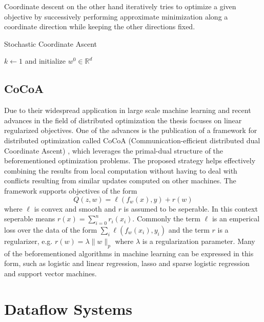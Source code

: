 Coordinate descent on the other hand iteratively tries to optimize a given objective by successively performing approximate minimization along a coordinate direction while keeping the other directions fixed.


\begin{algorithm}
\caption{Stochastic Coordinate Ascent}\label{alg:sca}
\begin{algorithmic}[1]
\State $k\gets 1$ and initialize $w^0 \in \mathbb{R}^d$
\Repeat
\For{}
\State
\EndFor
{}
\end{algorithmic}
\end{algorithm}


\subsection{CoCoA}
Due to their widespread application in large scale machine learning and recent advances in the field of distributed optimization the thesis focuses on linear regularized objectives.
One of the advances is the publication of a framework for distributed optimization called CoCoA (Communication-efficient distributed dual Coordinate Ascent) \cite{Jaggi2014}, which leverages the primal-dual structure of the beforementioned optimization problems.
The proposed strategy helps effectively combining the results from local computation without having to deal with conflicts resulting from similar updates computed on other machines.
The framework supports objectives of the form
\begin{equation}
Q(z,w) = \textit{$\ell$}(f_w(x),y) + \textit{r}(w)
\label{eqn:lin_loss}
\end{equation}
where $\ell$ is convex and smooth and $r$ is assumed to be seperable. In this context seperable means $r(x) = \sum_{i=0}^nr_i(x_i)$.
Commonly the term $\ell$ is an emperical loss over the data of the form $\sum_{i} \ell(f_w(x_i), y_i)$ and the term $r$ is a regularizer, e.g. $r(w) = \lambda\|w\|_p$ where $\lambda$ is a regularization parameter.
Many of the beforementioned algorithms in machine learning can be expressed in this form, such as logistic and linear regression, lasso and sparse logistic regression and support vector machines.



\section{Dataflow Systems}
\label{s:dataflow}

